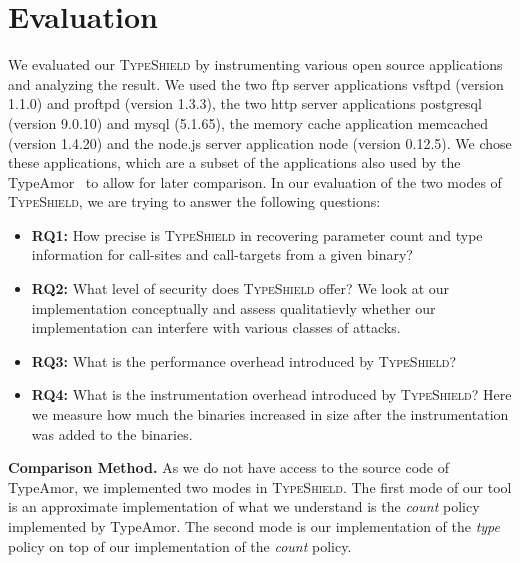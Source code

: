 \section{Evaluation}
\label{chapter:Evaluation}
We evaluated our \textsc{TypeShield} by instrumenting various open source applications and analyzing the result. 
We used the two ftp server applications vsftpd (version 1.1.0) and proftpd (version 1.3.3), the two http server 
applications postgresql (version 9.0.10) and  mysql (5.1.65), the memory cache application memcached (version 1.4.20) 
and the node.js server application node (version 0.12.5). We chose these applications, which are a subset of the 
applications also used by the TypeAmor~\cite{veen:typearmor} to allow for later comparison.
In our evaluation of the two modes of 
\textsc{TypeShield}, we are trying to answer the following questions:
\begin{itemize}

 \item \textbf{RQ1:} How precise is \textsc{TypeShield} in recovering parameter count and type information for call-sites and call-targets from a given binary?

 \item \textbf{RQ2:} What level of security does \textsc{TypeShield} offer?
 We look at our implementation conceptually and assess qualitatievly whether our implementation can interfere with various classes of attacks. 

 \item \textbf{RQ3:} What is the performance overhead introduced by \textsc{TypeShield}?
 
 \item \textbf{RQ4:} What is the instrumentation overhead introduced by \textsc{TypeShield}?
 Here we measure how much the binaries increased in size after the instrumentation was added to the binaries.
\end{itemize}

\textbf{Comparison Method.} As we do not have access to the source code of TypeAmor, we implemented two modes in \textsc{TypeShield}. 
The first mode of our tool is an approximate implementation of what we understand is the \textit{count} 
policy implemented by TypeAmor. The second mode is our implementation of the \textit{type} policy on
top of our implementation of the \textit{count} policy. 

